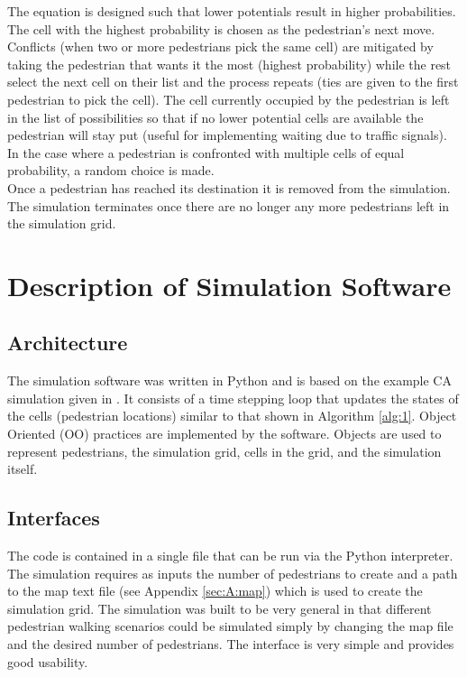 \documentclass[paper=a4, fontsize=11pt]{scrartcl}
\numberwithin{equation}{section}		%
\numberwithin{figure}{section}			%
\numberwithin{table}{section}		    %
\begin{document}
\noindent
The equation is designed such that lower potentials result in higher probabilities. The cell with 
the highest probability is chosen as the pedestrian's next move. Conflicts (when two or more 
pedestrians pick the same cell) are mitigated by taking the pedestrian that wants it the most 
(highest probability) while the rest select the next cell on their list and the process repeats 
(ties are given to the first pedestrian to pick the cell). The cell currently occupied by the 
pedestrian is left in the list of possibilities so that if no lower potential cells are available 
the pedestrian will stay put (useful for implementing waiting due to traffic signals). In the case 
where a pedestrian is confronted with multiple cells of equal probability, a random choice is made. 
\\

\noindent
Once a pedestrian has reached its destination it is removed from the simulation. The simulation 
terminates once there are no longer any more pedestrians left in the simulation grid.

\section{Description of Simulation Software} \label{sec:software}

\subsection{Architecture}
The simulation software was written in Python and is based on the example CA simulation given in 
\cite{SayamaBook}. It consists of a time stepping loop that updates the states of the cells 
(pedestrian locations) similar to that shown in Algorithm \ref{alg:1}. Object Oriented (OO) 
practices are implemented by the software. Objects are used to represent pedestrians, the 
simulation grid, cells in the grid, and the simulation itself.

\subsection{Interfaces}
The code is contained in a single file that can be run via the Python interpreter. The simulation 
requires as inputs the number of pedestrians to create and a path to the map text file (see 
Appendix \ref{sec:A:map}) which is used to create the simulation grid. The simulation was built to 
be very general in that different pedestrian walking scenarios could be simulated simply by 
changing the map file and the desired number of pedestrians. The interface is very simple and 
provides good usability.
\end{document}
